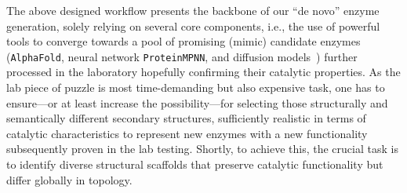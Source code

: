 \documentclass[runningheads]{llncs}
\begin{document}
	The above designed workflow  presents the backbone of our ``de novo'' enzyme generation, solely relying on several core components, i.e., the use of  powerful tools to converge towards a pool of promising (mimic) candidate enzymes (\texttt{AlphaFold}, neural network \texttt{ProteinMPNN}, and diffusion models~\cite{jumper2020alphafold,dauparas2022robust,yim2024diffusion})  further processed in the laboratory hopefully confirming their catalytic properties. As the lab piece of puzzle is most time-demanding but also  expensive task, one has to ensure---or at least increase the possibility---for selecting those structurally and semantically different secondary structures, sufficiently realistic in terms of catalytic characteristics to represent  new enzymes with a new functionality subsequently proven in the lab testing. Shortly, to achieve this, the crucial task is to identify diverse structural scaffolds that preserve catalytic functionality but differ globally in topology.
	
\end{document}
